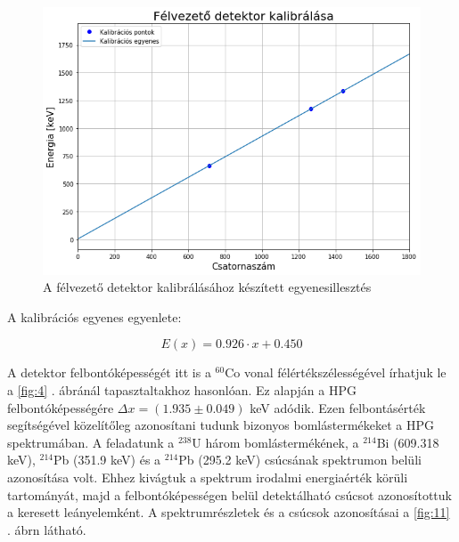 \documentclass[12pt,a4paper]{article}
\begin{document}
\begin{figure}[!h]
\centering
\includegraphics[scale=0.60]{HPG_kalib}
\caption{A félvezető detektor kalibrálásához készített egyenesillesztés}
\label{fig:10}
\end{figure}

A kalibrációs egyenes egyenlete:

$$E(x)=0.926 \cdot x + 0.450$$

A detektor felbontóképességét itt is a $^{60}$Co vonal félértékszélességével írhatjuk le a \ref{fig:4} . ábránál tapasztaltakhoz hasonlóan. Ez alapján a HPG felbontóképességére $\Delta x = (1.935 \pm 0.049)$ keV adódik. Ezen felbontásérték segítségével közelítőleg azonosítani tudunk bizonyos bomlástermékeket a HPG spektrumában. A feladatunk a $^{238}$U három bomlástermékének, a $^{214}$Bi (609.318 keV), $^{214}$Pb (351.9 keV) és a $^{214}$Pb (295.2 keV) csúcsának spektrumon belüli azonosítása volt. Ehhez kivágtuk a spektrum irodalmi energiaérték körüli tartományát, majd a felbontóképességen belül detektálható csúcsot azonosítottuk a keresett leányelemként. A spektrumrészletek és a csúcsok azonosításai a \ref{fig:11} . ábrn látható.
\newpage
\end{document}
